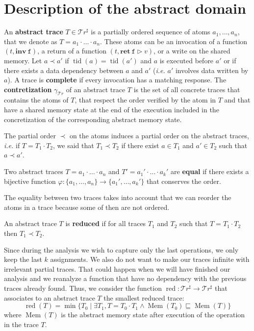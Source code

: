 \documentclass[runningheads]{llncs}
\newcommand{\inv}[1]{\mathbf{inv}\ \mathtt{#1}}
\newcommand{\ret}[2]{\mathbf{ret}\ \mathtt{#1} \vartriangleright #2}
\newcommand{\Traces}{\mathcal T\!r}
\newcommand{\aTraces}{\mathcal T\!r^\sharp}
\DeclareMathOperator{\tid}{tid}
\DeclareMathOperator{\red}{red}
\DeclareMathOperator{\Mem}{Mem}
\begin{document}
\section{Description of the abstract domain}
\label{sec:absDom}

\begin{definition}
	An \textbf{abstract trace} $T \in \aTraces$ is a partially ordered sequence of atoms $a_1, \dots, a_n$, that we denote as $T = a_1 \cdot \ldots \cdot a_n$. These atoms can be an invocation of a function $(t, \inv{f})$, a return of a function $(t, \ret{f}{v})$, or a write on the shared memory. Let $a \prec a'$ if $\tid(a) = \tid(a')$ and $a$ is executed before $a'$ or if there exists a data dependency between $a$ and $a'$ (\emph{i.e.} $a'$ involves data written by $a$). A trace is \textbf{complete} if every invocation has a matching response. The \textbf{contretization} $\gamma_{\Traces}$ of an abstract trace $T$ is the set of all concrete traces that contains the atoms of $T$, that respect the order verified by the atom in $T$ and that have a shared memory state at the end of the execution included in the concretization of the corresponding abstract memory state.
\end{definition}

The partial order $\prec$ on the atoms induces a partial order on the abstract traces, \textit{i.e.} if $T = T_1 \cdot T_2$, we said that $T_1 \prec T_2$ if there exist $a\in T_1$ and $a' \in T_2$ such that $a\prec a'$. 


\begin{definition}
		Two abstract traces $T = a_1 \cdot \ldots \cdot a_n$ and $T' = a_1' \cdot \ldots \cdot a_k'$ are \textbf{equal} if there exists a bijective function $\varphi : \{a_1,\dots,a_n\} \rightarrow \{a_1',\dots, a_k'\}$ that conserves the order. 
\end{definition}

The equality between two traces takes into account that we can reorder the atoms in a trace because some of then are not ordered. 

\begin{definition}
	An abstract trace $T$ is \textbf{reduced} if for all traces $T_1$ and $T_2$ such that $T=T_1\cdot T_2$ then $T_1 \prec T_2$. 
\end{definition}



Since during the analysis we wish to capture only the last operations, we only keep the last $k$ assignments. We also do not want to make our traces infinite with irrelevant partial traces. That could happen when we will have finished our analysis and we reanalyze a function that have no dependency with the previous traces already found. Thus, we consider the function $\red : \aTraces \rightarrow \aTraces$ that associates to an abstract trace $T$ the smallest reduced trace:
\begin{equation} \label{eq:red}
	\red(T) = \min \{T_0 \mid \exists T_1, T = T_0 \cdot T_1 \wedge \Mem(T_0) \sqsubseteq \Mem(T)\}
\end{equation}%
where $\Mem(T)$ is the abstract memory state after execution of the operation in the trace $T$. 
\end{document}
